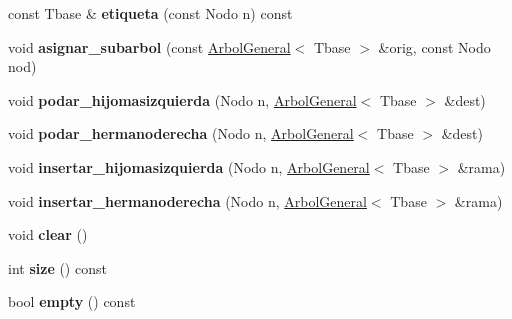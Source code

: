 \begin{DoxyCompactItemize}
\item 
const Tbase \& {\bfseries etiqueta} (const Nodo n) const \hypertarget{class_arbol_general_a191b525e0e6c8dec3a1430139f516847}{}\label{class_arbol_general_a191b525e0e6c8dec3a1430139f516847}

\item 
void {\bfseries asignar\+\_\+subarbol} (const \hyperlink{class_arbol_general}{Arbol\+General}$<$ Tbase $>$ \&orig, const Nodo nod)\hypertarget{class_arbol_general_ad9fddc80b179cac8eddc113a048334c1}{}\label{class_arbol_general_ad9fddc80b179cac8eddc113a048334c1}

\item 
void {\bfseries podar\+\_\+hijomasizquierda} (Nodo n, \hyperlink{class_arbol_general}{Arbol\+General}$<$ Tbase $>$ \&dest)\hypertarget{class_arbol_general_a7f2fa2d9be4af4b7be1c334819a04c39}{}\label{class_arbol_general_a7f2fa2d9be4af4b7be1c334819a04c39}

\item 
void {\bfseries podar\+\_\+hermanoderecha} (Nodo n, \hyperlink{class_arbol_general}{Arbol\+General}$<$ Tbase $>$ \&dest)\hypertarget{class_arbol_general_a81282ccc37494f1e13042e06ea475fb6}{}\label{class_arbol_general_a81282ccc37494f1e13042e06ea475fb6}

\item 
void {\bfseries insertar\+\_\+hijomasizquierda} (Nodo n, \hyperlink{class_arbol_general}{Arbol\+General}$<$ Tbase $>$ \&rama)\hypertarget{class_arbol_general_acf95226edb2a4e4c7fba82aaa82d0ec9}{}\label{class_arbol_general_acf95226edb2a4e4c7fba82aaa82d0ec9}

\item 
void {\bfseries insertar\+\_\+hermanoderecha} (Nodo n, \hyperlink{class_arbol_general}{Arbol\+General}$<$ Tbase $>$ \&rama)\hypertarget{class_arbol_general_a855d44f14a9ef638f8dd46376fc2f961}{}\label{class_arbol_general_a855d44f14a9ef638f8dd46376fc2f961}

\item 
void {\bfseries clear} ()\hypertarget{class_arbol_general_a3ae21db42586b23ccc082aeb321db56f}{}\label{class_arbol_general_a3ae21db42586b23ccc082aeb321db56f}

\item 
int {\bfseries size} () const \hypertarget{class_arbol_general_a69a2c10bedbf77dbc23baea0a731a02d}{}\label{class_arbol_general_a69a2c10bedbf77dbc23baea0a731a02d}

\item 
bool {\bfseries empty} () const \hypertarget{class_arbol_general_ab7b59c8fe7e74f78f3533965460a6c9a}{}\label{class_arbol_general_ab7b59c8fe7e74f78f3533965460a6c9a}


\end{DoxyCompactItemize}

